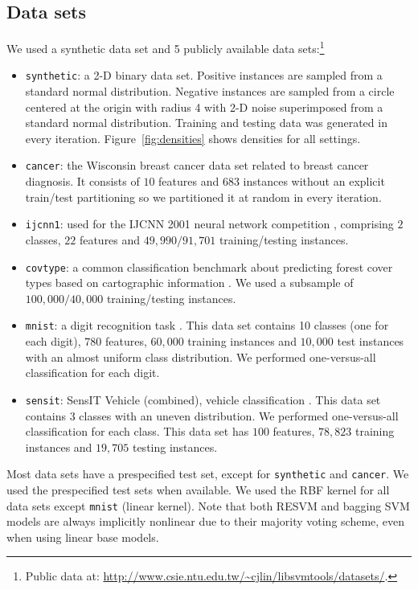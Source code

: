 \subsection{Data sets} \label{data} 
We used a synthetic data set and 5 publicly available data sets:\footnote{Public data at: \url{http://www.csie.ntu.edu.tw/~cjlin/libsvmtools/datasets/}.}
\begin{itemize}
\item \texttt{synthetic}: a 2-D binary data set. Positive instances are sampled from a standard normal distribution. Negative instances are sampled from a circle centered at the origin with radius 4 with 2-D noise superimposed from a standard normal distribution. Training and testing data was generated in every iteration. Figure~\ref{fig:densities} shows densities for all settings. 
\item \texttt{cancer}: the Wisconsin breast cancer data set related to breast cancer diagnosis. It consists of $10$ features and $683$ instances without an explicit train/test partitioning so we partitioned it at random in every iteration.
\item \texttt{ijcnn1}: used for the IJCNN 2001 neural network competition \citep{prokhorov2001ijcnn}, comprising $2$ classes, $22$ features and $49,990/91,701$ training/testing instances.
\item \texttt{covtype}: a common classification benchmark about predicting forest cover types based on cartographic information \citep{Blackard00covtype}. We used a subsample of $100,000/40,000$ training/testing instances.
\item \texttt{mnist}: a digit recognition task \citep{Lecun98gradient-basedlearning}. This data set contains 10 classes (one for each digit), $780$ features, $60,000$ training instances and $10,000$ test instances with an almost uniform class distribution. We performed one-versus-all classification for each digit.
\item \texttt{sensit}: SensIT Vehicle (combined), vehicle classification \citep{duarte2004vehicle}. This data set contains 3 classes with an uneven distribution. We performed one-versus-all classification for each class. This data set has $100$ features, $78,823$ training instances and $19,705$ testing instances.
\end{itemize}

Most data sets have a prespecified test set, except for \texttt{synthetic} and \texttt{cancer}. We used the prespecified test sets when available. We used the RBF kernel for all data sets except \texttt{mnist} (linear kernel). Note that both RESVM and bagging SVM models are always implicitly nonlinear due to their majority voting scheme, even when using linear base models.

